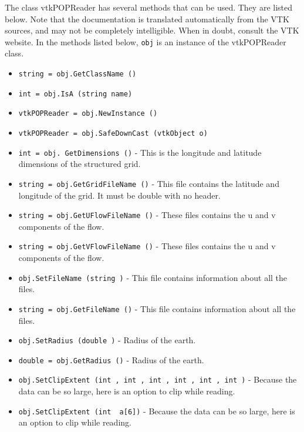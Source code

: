 The class vtkPOPReader has several methods that can be used.
  They are listed below.
Note that the documentation is translated automatically from the VTK sources,
and may not be completely intelligible.  When in doubt, consult the VTK website.
In the methods listed below, \verb|obj| is an instance of the vtkPOPReader class.
\begin{itemize}
\item  \verb|string = obj.GetClassName ()|

\item  \verb|int = obj.IsA (string name)|

\item  \verb|vtkPOPReader = obj.NewInstance ()|

\item  \verb|vtkPOPReader = obj.SafeDownCast (vtkObject o)|

\item  \verb|int = obj. GetDimensions ()| -  This is the longitude and latitude dimensions of the structured grid.

\item  \verb|string = obj.GetGridFileName ()| -  This file contains the latitude and longitude of the grid.  
 It must be double with no header.

\item  \verb|string = obj.GetUFlowFileName ()| -  These files contains the u and v components of the flow.

\item  \verb|string = obj.GetVFlowFileName ()| -  These files contains the u and v components of the flow.

\item  \verb|obj.SetFileName (string )| -  This file contains information about all the files.

\item  \verb|string = obj.GetFileName ()| -  This file contains information about all the files.

\item  \verb|obj.SetRadius (double )| -  Radius of the earth.

\item  \verb|double = obj.GetRadius ()| -  Radius of the earth.

\item  \verb|obj.SetClipExtent (int , int , int , int , int , int )| -  Because the data can be so large, here is an option to clip
 while reading.

\item  \verb|obj.SetClipExtent (int  a[6])| -  Because the data can be so large, here is an option to clip
 while reading.


\end{itemize}
